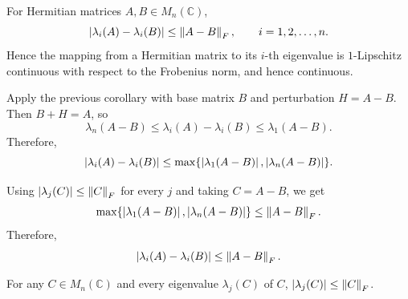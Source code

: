 \begin{theorem}
For Hermitian matrices $A,B\in M_n(\mathbb{C})$,
\[
    \left\lvert \lambda_i(A)-\lambda_i(B) \right\rvert
    \le
    \left\lVert A-B \right\rVert_F,
    \qquad
    i=1,2,\dots,n.
\]
Hence the mapping from a Hermitian matrix to its $i$-th eigenvalue is
$1$-Lipschitz continuous with respect to the Frobenius norm, and hence continuous.
\end{theorem}

\begin{pfbox}
Apply the previous corollary with base matrix $B$ and perturbation
$H=A-B$. Then $B+H=A$, so
\[
    \lambda_n(A-B)
    \le
    \lambda_i(A)-\lambda_i(B)
    \le
    \lambda_1(A-B).
\]
Therefore,
\[
    \left\lvert \lambda_i(A)-\lambda_i(B) \right\rvert
    \le
    \max\{\left\lvert \lambda_1(A-B) \right\rvert,\left\lvert \lambda_n(A-B) \right\rvert\}.
\]

Using $\left\lvert \lambda_j(C) \right\rvert\le\left\lVert C \right\rVert_F$ for every $j$ and taking $C=A-B$, we get
\[
    \max\{\left\lvert \lambda_1(A-B) \right\rvert,\left\lvert \lambda_n(A-B) \right\rvert\}
    \le
    \left\lVert A-B \right\rVert_F.
\]
Therefore,
\[
    \left\lvert \lambda_i(A)-\lambda_i(B) \right\rvert
    \le
    \left\lVert A-B \right\rVert_F.
\]
\end{pfbox}




\begin{theorem}
For any $C\in M_n(\mathbb{C})$ and every eigenvalue $\lambda_j(C)$ of $C$, $\left\lvert \lambda_j(C) \right\rvert\le\left\lVert C \right\rVert_F$.
\end{theorem}


